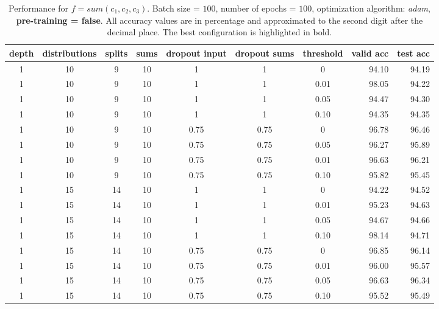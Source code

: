 \begin{table}[H]
  \centering
  \caption{Performance for $\mathit{f} = sum(\mathit{c}_1,\mathit{c}_2,\mathit{c}_3)$. Batch size = $100$, number of epochs = $100$, optimization algorithm: \textit{adam}, \textbf{pre-training = false}. All accuracy values are in percentage and approximated to the second digit after the decimal place. The best configuration is highlighted in bold.}
  \label{tab:results-triples-clno}
  \scriptsize
  \begin{tabular}{cccccccrr}
    \toprule
    depth		& distributions 	& splits 		& sums 				& dropout input 		& dropout sums 			& threshold				& valid acc 			& test acc\\
    \midrule
	1      		& 10     			& 9      		& 10     			& 1      				& 1      				& 0      				& 94.10    				& 94.19\\ 
	1      		& 10     			& 9				& 10     			& 1      				& 1      				& 0.01    				& 98.05    			    & 94.22\\ 
	1      		& 10     			& 9      		& 10     			& 1      				& 1      				& 0.05    				& 94.47    				& 94.30\\
	1      		& 10     			& 9      		& 10     			& 1      				& 1      				& 0.10    				& 94.35    				& 94.35\\
    1      		& 10     			& 9      		& 10     			& 0.75    				& 0.75    				& 0      				& 96.78    				& 96.46\\
	1      		& 10     			& 9      		& 10     			& 0.75    				& 0.75    				& 0.05    				& 96.27    				& 95.89\\
	1      		& 10     			& 9      		& 10     			& 0.75    				& 0.75    				& 0.01    				& 96.63    				& 96.21\\ 
	1      		& 10     			& 9      		& 10     			& 0.75    				& 0.75    				& 0.10    				& 95.82    				& 95.45\\ 

	1      		& 15     			& 14     		& 10     			& 1      				& 1      				& 0      				& 94.22    				& 94.52\\
	1      		& 15     			& 14     		& 10     			& 1      				& 1      				& 0.01    				& 95.23    				& 94.63\\ 		
	1      		& 15     			& 14     		& 10     			& 1      				& 1      				& 0.05    				& 94.67    				& 94.66\\
	1      		& 15     			& 14     		& 10     			& 1      				& 1      				& 0.10    				& 98.14					& 94.71\\
	1      		& 15     			& 14     		& 10     			& 0.75    				& 0.75    				& 0      				& 96.85					& 96.14\\ 
	1      		& 15     			& 14     		& 10     			& 0.75					& 0.75					& 0.01					& 96.00    				& 95.57\\ 
	1      		& 15     			& 14     		& 10     			& 0.75    				& 0.75    				& 0.05    				& 96.63    				& 96.34\\ 
	1      		& 15     			& 14     		& 10     			& 0.75    				& 0.75    				& 0.10    				& 95.52    				& 95.49\\ 


\end{tabular}
\end{table}
